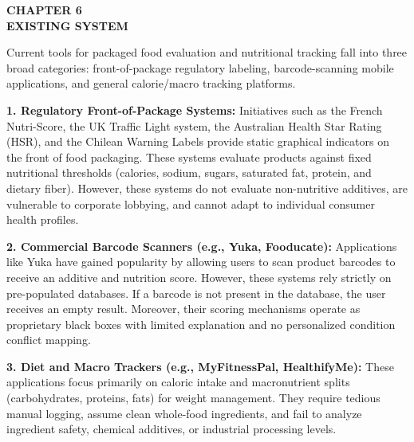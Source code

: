 \documentclass[12pt]{article}
\begin{document}
\newpage

\begin{center}
\textbf{\Large CHAPTER 6}\\[0.5cm]
\textbf{\Large EXISTING SYSTEM}\\[1cm]
\end{center}

\noindent
Current tools for packaged food evaluation and nutritional tracking fall into three broad categories: front-of-package regulatory labeling, barcode-scanning mobile applications, and general calorie/macro tracking platforms.

\vspace{0.3cm}

\noindent
\textbf{1. Regulatory Front-of-Package Systems:}
Initiatives such as the French Nutri-Score, the UK Traffic Light system, the Australian Health Star Rating (HSR), and the Chilean Warning Labels provide static graphical indicators on the front of food packaging. These systems evaluate products against fixed nutritional thresholds (calories, sodium, sugars, saturated fat, protein, and dietary fiber). However, these systems do not evaluate non-nutritive additives, are vulnerable to corporate lobbying, and cannot adapt to individual consumer health profiles.

\vspace{0.3cm}

\noindent
\textbf{2. Commercial Barcode Scanners (e.g., Yuka, Fooducate):}
Applications like Yuka have gained popularity by allowing users to scan product barcodes to receive an additive and nutrition score. However, these systems rely strictly on pre-populated databases. If a barcode is not present in the database, the user receives an empty result. Moreover, their scoring mechanisms operate as proprietary black boxes with limited explanation and no personalized condition conflict mapping.

\vspace{0.3cm}

\noindent
\textbf{3. Diet and Macro Trackers (e.g., MyFitnessPal, HealthifyMe):}
These applications focus primarily on caloric intake and macronutrient splits (carbohydrates, proteins, fats) for weight management. They require tedious manual logging, assume clean whole-food ingredients, and fail to analyze ingredient safety, chemical additives, or industrial processing levels.

\vspace{0.5cm}
\end{document}
